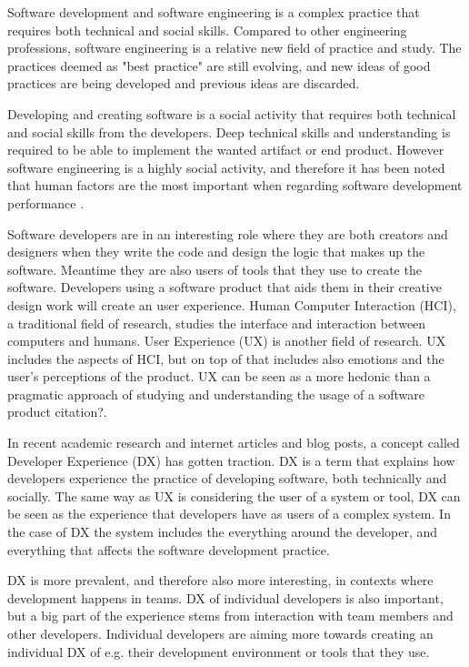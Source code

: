 \documentclass[english, 12pt, a4paper, sci, utf8, a-1b, online]{aaltothesis}
\begin{document}
Software development and software engineering is a complex practice that requires both technical and social skills. Compared to other engineering professions, software engineering is a relative new field of practice and study. The practices deemed as "best practice" are still evolving, and new ideas of good practices are being developed and previous ideas are discarded.

Developing and creating software is a social activity that requires both technical and social skills from the developers. Deep technical skills and understanding is required to be able to implement the wanted artifact or end product. However software engineering is a highly social activity, and therefore it has been noted that human factors are the most important when regarding software development performance \cite{peopleware}.

Software developers are in an interesting role where they are both creators and designers when they write the code and design the logic that makes up the software. Meantime they are also users of tools that they use to create the software. Developers using a software product that aids them in their creative design work will create an user experience. Human Computer Interaction (HCI), a traditional field of research, studies the interface and interaction between computers and humans. User Experience (UX) is another field of research. UX includes the aspects of HCI, but on top of that includes also emotions and the user's perceptions of the product. UX can be seen as a more hedonic than a pragmatic approach of studying and understanding the usage of a software product {\color{red} citation?}.

In recent academic research and internet articles and blog posts, a concept called Developer Experience (DX) has gotten traction. DX is a term that explains how developers experience the practice of developing software, both technically and socially. The same way as UX is considering the user of a system or tool, DX can be seen as the experience that developers have as users of a complex system. In the case of DX the system includes the everything around the developer, and everything that affects the software development practice.

DX is more prevalent, and therefore also more interesting, in contexts where development happens in teams. DX of individual developers is also important, but a big part of the experience stems from interaction with team members and other developers. Individual developers are aiming more towards creating an individual DX of e.g. their development environment or tools that they use.
\end{document}
